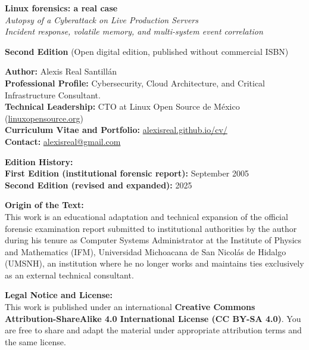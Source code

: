 \thispagestyle{empty}
\vspace*{\fill}

{\footnotesize
\noindent
\textbf{Linux forensics: a real case}\\
\textit{Autopsy of a Cyberattack on Live Production Servers}\\
\textit{Incident response, volatile memory, and multi-system event correlation}

\vspace{1.0em}
\noindent
\textbf{Second Edition} (Open digital edition, published without commercial ISBN)

\vspace{0.8em}
\noindent
\textbf{Author:} Alexis Real Santillán\\
\textbf{Professional Profile:} Cybersecurity, Cloud Architecture, and Critical Infrastructure Consultant.\\
\textbf{Technical Leadership:} CTO at Linux Open Source de México (\href{https://linuxopensource.org}{linuxopensource.org})\\
\textbf{Curriculum Vitae and Portfolio:} \href{https://alexisreal.github.io/cv/}{alexisreal.github.io/cv/}\\
\textbf{Contact:} \href{mailto:alexisreal@gmail.com}{alexisreal@gmail.com}

\vspace{1.0em}
\noindent
\textbf{Edition History:}\\
\textbf{First Edition (institutional forensic report):} September 2005\\
\textbf{Second Edition (revised and expanded):} 2025

\vspace{1.0em}
\noindent
\textbf{Origin of the Text:}\\
This work is an educational adaptation and technical expansion of the official forensic examination report submitted to institutional authorities by the author during his tenure as Computer Systems Administrator at the Institute of Physics and Mathematics (IFM), Universidad Michoacana de San Nicolás de Hidalgo (UMSNH), an institution where he no longer works and maintains ties exclusively as an external technical consultant.

\vspace{1.0em}
\noindent
\textbf{Legal Notice and License:}\\
This work is published under an international \textbf{Creative Commons Attribution-ShareAlike 4.0 International License (CC BY-SA 4.0)}. You are free to share and adapt the material under appropriate attribution terms and the same license.

}
